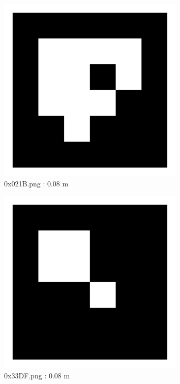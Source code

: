 \documentclass[11pt,a4,BCOR=0cm]{scrartcl}
\begin{document}
\begin{figure}
  \centering
    \includegraphics[width=8.955cm]{0x021B.pdf}
    \caption{0x021B.png : 0.08 m}
    \label{fig:0x021B.pdf}
  
\end{figure} 

\clearpage

\begin{figure}
  \centering
    \includegraphics[width=8.955cm]{0x33DF.pdf}
    \caption{0x33DF.png : 0.08 m}
    \label{fig:0x33DF.pdf}
  
\end{figure} 
\end{document}
